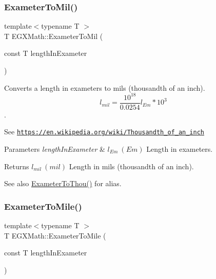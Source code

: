 \subsubsection{\texorpdfstring{Exameter\+To\+Mil()}{ExameterToMil()}}
{\footnotesize\ttfamily template$<$typename T $>$ \\
T E\+G\+X\+Math\+::\+Exameter\+To\+Mil (\begin{DoxyParamCaption}\item[{const T}]{length\+In\+Exameter }\end{DoxyParamCaption})}



Converts a length in exameters to mils (thousandth of an inch). \[ l_{mil}= \frac{10^{18}}{0.0254} l_{Em} * 10^{3} \]. 

See \href{https://en.wikipedia.org/wiki/Thousandth_of_an_inch}{\tt https\+://en.\+wikipedia.\+org/wiki/\+Thousandth\+\_\+of\+\_\+an\+\_\+inch} 
\begin{DoxyParams}{Parameters}
{\em length\+In\+Exameter} & $ l_{Em}\ (Em)$ Length in exameters. \\
\hline
\end{DoxyParams}
\begin{DoxyReturn}{Returns}
$ l_{mil}\ (mil)$ Length in mils (thousandth of an inch). 
\end{DoxyReturn}
\begin{DoxySeeAlso}{See also}
\mbox{\hyperlink{group___e_g_x_math-_conversions-_length_conversions-_s_i-_exameter-_imperial_gafee1930a425fcae4f9a3d8631aa62b05}{Exameter\+To\+Thou()}} for alias. 
\end{DoxySeeAlso}
\mbox{\label{group___e_g_x_math-_conversions-_length_conversions-_s_i-_exameter-_imperial_ga352ae8fb1bf743a0978e3ed05b06b61b}} 
\subsubsection{\texorpdfstring{Exameter\+To\+Mile()}{ExameterToMile()}}
{\footnotesize\ttfamily template$<$typename T $>$ \\
T E\+G\+X\+Math\+::\+Exameter\+To\+Mile (\begin{DoxyParamCaption}\item[{const T}]{length\+In\+Exameter }\end{DoxyParamCaption})}



